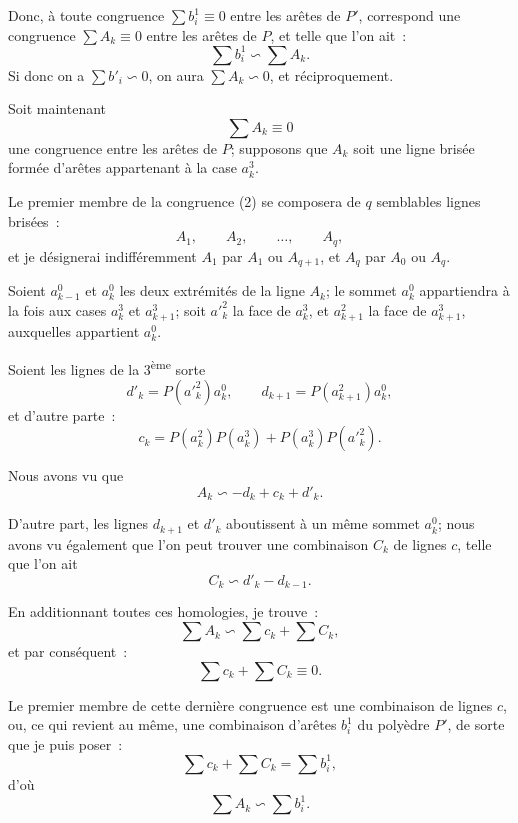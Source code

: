 \documentclass{article}
\begin{document}
Donc, à toute congruence $\displaystyle\sum b^{1}_{i} \equiv 0$ entre les arêtes de $P'$, correspond une congruence $\displaystyle\sum A_{k} \equiv 0$ entre les arêtes de $P$, et telle que l'on ait~:
\[ \sum b^{1}_{i} \backsim \sum A_{k}. \]
Si donc on a $\displaystyle\sum b'_{i} \backsim 0$, on aura $\displaystyle\sum A_{k} \backsim 0$, et réciproquement.

Soit maintenant
\[ \sum A_{k} \equiv 0 \tag{2} \]
une congruence entre les arêtes de $P$; supposons que $A_{k}$ soit une ligne brisée formée d'arêtes appartenant à la case $a^{3}_{k}$.

Le premier membre de la congruence (2) se composera de $q$
semblables lignes brisées~:
\[ A_{1}, \qquad A_{2}, \qquad \ldots, \qquad A_{q}, \]
et je désignerai indifféremment $A_{1}$ par $A_{1}$ ou $A_{q+1}$, et $A_{q}$ par $A_{0}$ ou $A_{q}$.

Soient $a^{0}_{k-1}$ et $a^{0}_{k}$ les deux extrémités de la ligne $A_{k}$; le sommet $a^{0}_{k}$ appartiendra à la fois aux cases $a^{3}_{k}$ et $a^{3}_{k+1}$; soit $a'^{2}_{k}$ la face de $a^{3}_{k}$, et $a^{2}_{k+1}$ la face de $a^{3}_{k+1}$, auxquelles appartient $a^{0}_{k}$.

Soient les lignes de la 3\textsuperscript{ème} sorte
\[ d'_{k} = P(a'^{2}_{k}) a^{0}_{k}, \qquad d_{k+1} = P(a^{2}_{k+1}) a^{0}_{k}, \]
et d'autre parte~:
\[ c_{k} = P(a^{2}_{k}) P(a^{3}_{k}) + P(a^{3}_{k}) P(a'^{2}_{k}). \]

Nous avons vu que
\[ A_{k} \backsim - d_{k} + c_{k} + d'_{k}. \]

D'autre part, les lignes $d_{k+1}$ et $d'_{k}$ aboutissent à un même sommet $a^{0}_{k}$; nous avons vu également que l'on peut trouver une combinaison $C_{k}$ de lignes $c$, telle que l'on ait
\[ C_{k} \backsim d'_{k} - d_{k-1}. \] 

En additionnant toutes ces homologies, je trouve~:
\[ \sum A_{k} \backsim \sum c_{k} + \sum C_{k}, \]
et par conséquent~:
\[ \sum c_{k} + \sum C_{k} \equiv 0. \]

Le premier membre de cette dernière congruence est une combinaison de lignes $c$, ou, ce qui revient au même, une combinaison d'arêtes $b^{1}_{i}$ du polyèdre $P'$, de sorte que je puis poser~:
\[ \sum c_{k} + \sum C_{k} = \sum b^{1}_{i}, \]
d'où
\[ \sum A_{k} \backsim \sum b^{1}_{i}. \]
\end{document}
